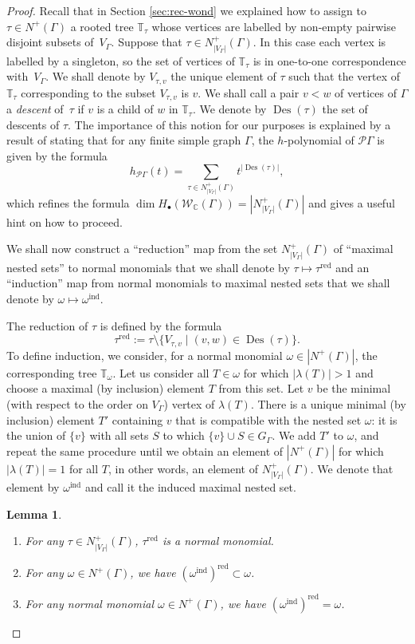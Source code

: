 \documentclass[11pt]{article}
\newtheorem{lemma}[theo]{Lemma}
\theoremstyle{definition}
\numberwithin{equation}{section}
\newcommand\calP{\mathcal{P}}
\newcommand\calW{\mathcal{W}}
\DeclareMathOperator{\Des}{Des}
\begin{document}
\begin{proof}
Recall that in Section \ref{sec:rec-wond} we explained how to assign to $\tau\in N^+(\Gamma)$ a rooted tree $\mathbb{T}_\tau$ whose vertices are labelled by non-empty pairwise disjoint subsets of~$V_\Gamma$. Suppose that $\tau\in N^+_{|V_\Gamma|}(\Gamma)$. In this case each vertex is labelled by a singleton, so the set of vertices of $\mathbb{T}_\tau$ is in one-to-one  correspondence with~$V_\Gamma$. We shall denote by $V_{\tau,v}$ the unique element of $\tau$ such that the vertex of $\mathbb{T}_\tau$ corresponding to the subset $V_{\tau,v}$ is $v$. We shall call a pair $v<w$ of vertices of $\Gamma$ a \emph{descent} of~$\tau$ \cite{MR2520477} if $v$ is a child of $w$ in $\mathbb{T}_\tau$. We denote by $\Des(\tau)$ the set of descents of $\tau$. The importance of this notion for our purposes is explained by a result of \cite{MR2520477} stating that for any finite simple graph $\Gamma$, the $h$-polynomial of $\calP\Gamma$ is given by the formula
\[h_{\calP\Gamma}(t)=\sum_{\tau\in N^+_{|V_\Gamma|}(\Gamma)} t^{|\Des(\tau)|},\]
which refines the formula $\dim H_{\bullet}(\calW_{\mathbb{C}}(\Gamma))=|N^+_{|V_\Gamma|}(\Gamma)|$ and gives a useful hint on how to proceed.

We shall now construct a ``reduction'' map from the set $N^+_{|V_\Gamma|}(\Gamma)$ of ``maximal nested sets'' to normal monomials that we shall denote by $\tau\mapsto \tau^{\mathrm{red}}$ and an ``induction'' map from normal monomials to maximal nested sets that we shall denote by $\omega\mapsto \omega^{\mathrm{ind}}$.

The reduction of $\tau$ is defined by the formula
 \[
\tau^{\mathrm{red}}:=\tau\setminus\{V_{\tau,v}\mid (v,w)\in\Des(\tau)\}.
 \]
To define induction, we consider, for a normal monomial $\omega\in |N^+(\Gamma)|$, the corresponding tree $\mathbb{T}_\omega$. Let us consider all $T\in\omega$ for which $|\lambda(T)|>1$ and choose a maximal (by inclusion) element $T$ from this set. Let $v$ be the minimal (with respect to the order on $V_\Gamma$) vertex of $\lambda(T)$. There is a unique minimal (by inclusion) element $T'$ containing $v$ that is compatible with the nested set $\omega$: it is the union of $\{v\}$ with all sets $S$ to which $\{v\}\cup S\in G_\Gamma$. We add $T'$ to $\omega$, and repeat the same procedure until we obtain an element of $|N^+(\Gamma)|$  for which $|\lambda(T)|=1$ for all $T$, in other words, an element of $N^+_{|V_\Gamma|}(\Gamma)$. We denote that element by $\omega^{\mathrm{ind}}$ and call it the induced maximal nested set.

\begin{lemma}\leavevmode
\begin{enumerate}
\item For any $\tau\in N^+_{|V_\Gamma|}(\Gamma)$, $\tau^{\mathrm{red}}$ is a normal monomial.   
\item For any $\omega\in N^+(\Gamma)$, we have $(\omega^{\mathrm{ind}})^{\mathrm{red}}\subset\omega$.
\item For any normal monomial $\omega\in N^+(\Gamma)$, we have $(\omega^{\mathrm{ind}})^{\mathrm{red}}=\omega$.
\end{enumerate}
\end{lemma}


\end{proof}
\end{document}
